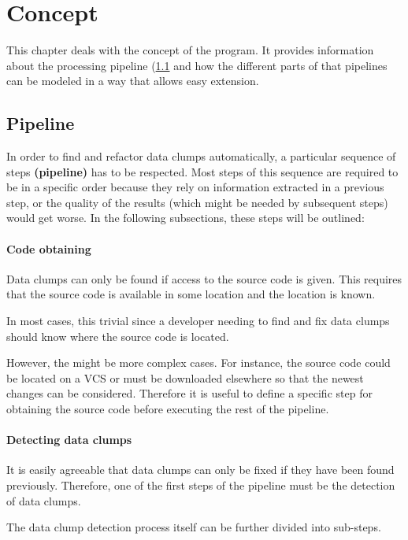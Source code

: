 \begingroup
\renewcommand{\cleardoublepage}{} %
\renewcommand{\clearpage}{}
\chapter{Concept}\label{chapter_conception}
\endgroup
This chapter deals with the concept of the program. It provides information about the processing pipeline (\ref{sec:pipeline} and how the different parts of that pipelines can be modeled in a way that allows easy extension. 


\hfill
\section{Pipeline}\label{sec:pipeline}
In order to find and refactor data clumps automatically, a particular sequence of steps \textbf{(pipeline)} has to be respected. Most steps of this sequence are required to be in a specific order because they rely on information extracted in a previous step, or the quality of the results (which might be needed by subsequent steps) would get worse. In the following subsections, these steps will be outlined:
\subsubsection{Code obtaining}
Data clumps can only be found if access to the source code is given. This requires that the source code is available in some location and the location is known.

In most cases, this trivial since a developer needing to find and fix data clumps should know where the source code is located.

However, the might be more complex cases. For instance, the source code could be located on a \ac{VCS} or must be downloaded elsewhere so that the newest changes can be considered. Therefore it is useful to define a specific step for obtaining the source code before executing the rest of the pipeline. 
\subsubsection{Detecting data clumps}\label{subsec:chap3_data_clump_detection}
It is easily agreeable that data clumps can only be fixed if they have been found previously. Therefore, one of the first steps of the pipeline must be the detection of data clumps. 

The data clump detection process itself can be further divided into sub-steps.

